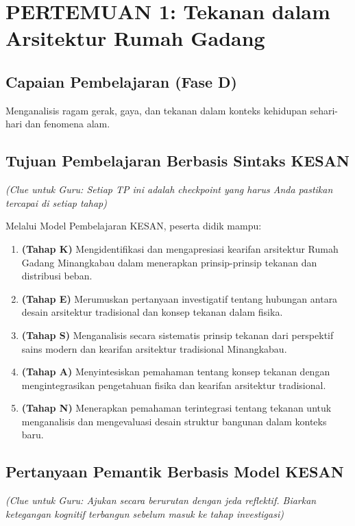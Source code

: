 \documentclass[12pt,a4paper]{article}
\begin{document}
\section{PERTEMUAN 1: Tekanan dalam Arsitektur Rumah Gadang}

\subsection{Capaian Pembelajaran (Fase D)}
Menganalisis ragam gerak, gaya, dan tekanan dalam konteks kehidupan sehari-hari dan fenomena alam.

\subsection{Tujuan Pembelajaran Berbasis Sintaks KESAN}
\textit{(Clue untuk Guru: Setiap TP ini adalah checkpoint yang harus Anda pastikan tercapai di setiap tahap)}

Melalui Model Pembelajaran KESAN, peserta didik mampu:

\begin{enumerate}
\item \textbf{(Tahap K)} Mengidentifikasi dan mengapresiasi kearifan arsitektur Rumah Gadang Minangkabau dalam menerapkan prinsip-prinsip tekanan dan distribusi beban.
\item \textbf{(Tahap E)} Merumuskan pertanyaan investigatif tentang hubungan antara desain arsitektur tradisional dan konsep tekanan dalam fisika.
\item \textbf{(Tahap S)} Menganalisis secara sistematis prinsip tekanan dari perspektif sains modern dan kearifan arsitektur tradisional Minangkabau.
\item \textbf{(Tahap A)} Menyintesiskan pemahaman tentang konsep tekanan dengan mengintegrasikan pengetahuan fisika dan kearifan arsitektur tradisional.
\item \textbf{(Tahap N)} Menerapkan pemahaman terintegrasi tentang tekanan untuk menganalisis dan mengevaluasi desain struktur bangunan dalam konteks baru.
\end{enumerate}

\subsection{Pertanyaan Pemantik Berbasis Model KESAN}
\textit{(Clue untuk Guru: Ajukan secara berurutan dengan jeda reflektif. Biarkan ketegangan kognitif terbangun sebelum masuk ke tahap investigasi)}
\end{document}
